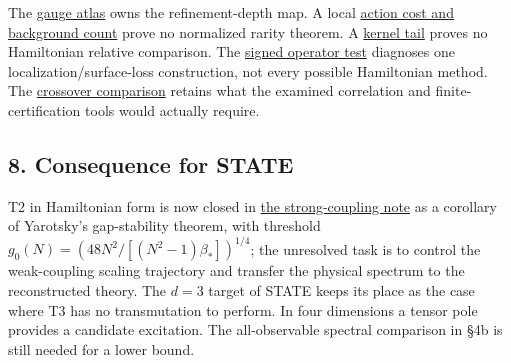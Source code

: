 \documentclass[11pt,a4paper]{article}
\begin{document}
The \href{halving-atlas.md}{gauge atlas} owns the refinement-depth map.
A local \href{large-field-action-lower-bound.md}{action cost and
background count} prove no normalized rarity theorem. A
\href{flow-conjugation-truncation.md\#exact-continuum-variation-and-its-gauge-convention}{kernel
tail} proves no Hamiltonian relative comparison. The
\href{large-field-operator-inequality.md}{signed operator test}
diagnoses one localization/surface-loss construction, not every possible
Hamiltonian method. The
\href{mass-gap-openings.md\#correlation-inequalities-and-the-transfer-they-require}{crossover
comparison} retains what the examined correlation and
finite-certification tools would actually require.

\subsection{8. Consequence for STATE}\label{consequence-for-state}

T2 in Hamiltonian form is now closed in
\href{strong-coupling-uniform-gap.md}{the strong-coupling note} as a
corollary of Yarotsky's gap-stability theorem, with threshold
\(g_0(N)=(48N^2/[(N^2-1)\beta_*])^{1/4}\); the unresolved task is to
control the weak-coupling scaling trajectory and transfer the physical
spectrum to the reconstructed theory. The \(d=3\) target of STATE keeps
its place as the case where T3 has no transmutation to perform. In four
dimensions a tensor pole provides a candidate excitation. The
all-observable spectral comparison in §4b is still needed for a lower
bound.
\end{document}
